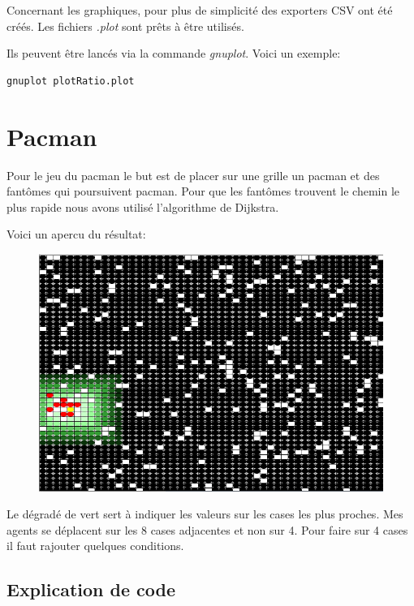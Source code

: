 \documentclass[a4paper,12pt]{report}
\begin{document}
Concernant les graphiques, pour plus de simplicité des exporters CSV ont été créés. Les fichiers \textit{.plot} sont pr\^ets à être utilisés.

Ils peuvent être lancés via la commande \textit{gnuplot}. Voici un exemple:

\begin{lstlisting}[style=Java]
gnuplot plotRatio.plot
\end{lstlisting}

\newpage

\section*{Pacman}

Pour le jeu du pacman le but est de placer sur une grille un pacman et des fantômes qui poursuivent pacman. Pour que les fantômes trouvent le chemin le plus rapide nous avons utilisé l'algorithme de Dijkstra.

Voici un apercu du résultat:

\begin{figure}[!ht]
	\center
	\includegraphics[scale=0.4]{./image/pacman.png}
\end{figure}

Le dégradé de vert sert à indiquer les valeurs sur les cases les plus proches.
Mes agents se déplacent sur les 8 cases adjacentes et non sur 4. Pour faire sur 4 cases il faut rajouter quelques conditions.

\subsection*{Explication de code}
\end{document}
